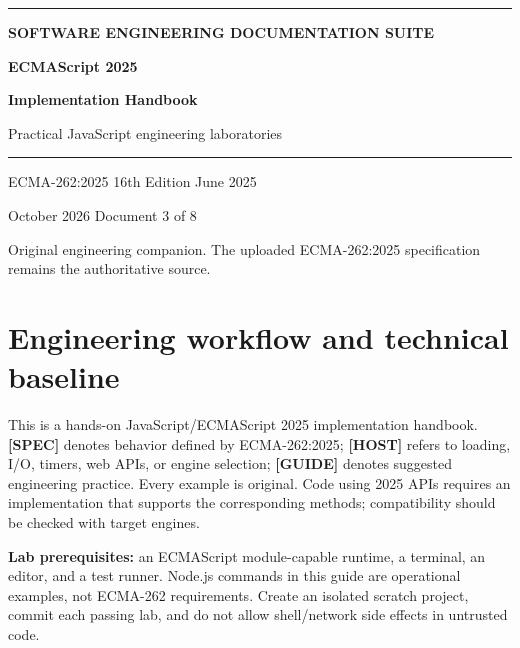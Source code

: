 \documentclass[11pt,letterpaper]{article}
\begin{document}
\hypersetup{pageanchor=false}%
\begin{titlepage}
\thispagestyle{empty}
\vspace*{2.8cm}
{\color{Gold}\rule{18mm}{3pt}}\par\vspace{18mm}
{\sffamily\Large\bfseries\color{Teal} SOFTWARE ENGINEERING DOCUMENTATION SUITE}\par
\vspace{8mm}
{\sffamily\huge\bfseries\color{DeepNavy} ECMAScript 2025 }\par
\vspace{4mm}
{\sffamily\fontsize{24}{29}\selectfont\bfseries\color{DeepNavy} Implementation Handbook }\par
\vspace{10mm}
{\large\color{Slate} Practical JavaScript engineering laboratories }\par
\vspace{16mm}
{\color{Teal}\rule{\textwidth}{0.8pt}}\par
\vfill
{\sffamily\color{Slate}\large ECMA-262:2025 \textbullet{} 16th Edition \textbullet{} June 2025}\par
\vspace{3mm}
{\sffamily\color{Slate} October 2026 \textbullet{} Document 3 of 8}\par
\vspace{3mm}
{\small\color{Slate} Original engineering companion. The uploaded ECMA-262:2025 specification remains the authoritative source.}\par
\end{titlepage}\hypersetup{pageanchor=true}
\tableofcontents
\clearpage
\section{Engineering workflow and technical baseline}\label{engineering-workflow-and-technical-baseline}

This is a hands-on JavaScript/ECMAScript 2025 implementation handbook. \textbf{{[}SPEC{]}} denotes behavior defined by ECMA-262:2025; \textbf{{[}HOST{]}} refers to loading, I/O, timers, web APIs, or engine selection; \textbf{{[}GUIDE{]}} denotes suggested engineering practice. Every example is original. Code using 2025 APIs requires an implementation that supports the corresponding methods; compatibility should be checked with target engines.

\textbf{Lab prerequisites:} an ECMAScript module-capable runtime, a terminal, an editor, and a test runner. Node.js commands in this guide are operational examples, not ECMA-262 requirements. Create an isolated scratch project, commit each passing lab, and do not allow shell/network side effects in untrusted code.
\end{document}
